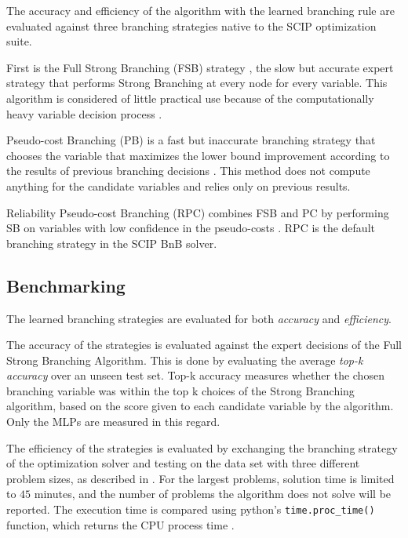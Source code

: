 The accuracy and efficiency of the algorithm with the learned branching rule are evaluated against three branching strategies native to the \gls{SCIP} optimization suite. 

First is the Full Strong Branching (\gls{FSB}) strategy \cite{applegate1995finding}, the slow but accurate expert strategy that performs Strong Branching at every node for every variable. This algorithm is considered of little practical use because of the computationally heavy variable decision process \cite{achterberg2004branching}.

Pseudo-cost Branching (PB) is a fast but inaccurate branching strategy \cite{gamrath2018measuring} that chooses the variable that maximizes the lower bound improvement according to the results of previous branching decisions \cite{benchiou1971experiments}. This method does not compute anything for the candidate variables and relies only on previous results. 

Reliability Pseudo-cost Branching (\gls{RPC}) \cite{achterberg2004branching} combines \gls{FSB} and \gls{PC} by performing SB on variables with low confidence in the pseudo-costs \cite{gamrath2018measuring}. \gls{RPC} is the default branching strategy in the \gls{SCIP} \gls{BnB} solver. 



\subsection{Benchmarking}\label{ssec:benchmarking}

The learned branching strategies are evaluated for both \textit{accuracy} and \textit{efficiency}. 

The accuracy of the strategies is evaluated against the expert decisions of the Full Strong Branching Algorithm. This is done by evaluating the average \textit{top-k accuracy} over an unseen test set. Top-k accuracy measures whether the chosen branching variable was within the top k choices of the Strong Branching algorithm, based on the score given to each candidate variable by the algorithm. Only the \gls{MLP}s are measured in this regard. 

The efficiency of the strategies is evaluated by exchanging the branching strategy of the optimization solver and testing on the data set with three different problem sizes, as described in . For the largest problems, solution time is limited to $ 45 $ minutes, and the number of problems the algorithm does not solve will be reported.
The execution time is compared using python's \verb|time.proc_time()| function, which returns the \gls{CPU} process time \cite{rossum2009python}. 


